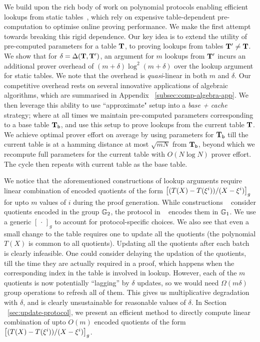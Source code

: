 \smallskip

 We build upon the rich body of work on polynomial protocols enabling efficient lookups from static tables~\cite{CCS:ZBKMNS22,EPRINT:PosKat22,EPRINT:ZGKMR22,EPRINT:EagFioGab22}, which rely on expensive table-dependent pre-computation
to optimise online proving performance. We make the first attempt towards breaking this rigid dependence.
Our key idea is to extend the utility of pre-computed
parameters for a table $\mathbf{T}$, to proving lookups from tables $\mathbf{T}'\neq \mathbf{T}$.
We show that for $\delta=\Delta(\mathbf{T}, \mathbf{T}')$,
an argument for $m$ lookups from $\mathbf{T}'$ incurs an additional prover overhead of $(m+\delta)\log^2(m+\delta)$ over the
lookup argument for static tables. We note that the overhead is {\em quasi}-linear in both $m$ and $\delta$.
Our competitive overhead rests on several innovative applications of algebraic
algorithms, which are summarised in Appendix ~\ref{subsec:comp-algebra-app}. We then leverage this ability to use ``approximate"
setup into a {\em base + cache} strategy; where at all times we maintain pre-computed parameters corresponding to
a base table $\mathbf{T}_{\mathsf{b}}$, and use this setup to prove lookups from the current table $\mathbf{T}$. We achieve optimal
prover effort on average by using parameters for $\mathbf{T}_{\mathsf{b}}$ till the current table is at a hamming distance
at most $\sqrt{mN}$ from $\mathbf{T}_{\mathsf{b}}$, beyond which we recompute full parameters for the current table with
$O(N\log N)$ prover effort. The cycle then repeats with current table as the base table.

\smallskip

 We notice that the aforementioned constructions of lookup arguments require linear combination of
encoded quotients of the form $\left[{(T(X)-T(\xi^i))/(X-\xi^i)}\right]_g$ for upto $m$ values of $i$ during the proof generation.
While constructions ~\cite{CCS:ZBKMNS22,EPRINT:PosKat22}
consider quotients encoded in the group $\mathbb{G}_2$, the protocol in ~\cite{EPRINT:EagFioGab22} encodes them in $\mathbb{G}_1$.
We use a generic $[\,\cdot\,]_g$ to
account for protocol-specific choices. We also see that even a small change to the table requires one to update all the quotients (the polynomial $T(X)$ is
common to all quotients). Updating all the quotients after each batch is clearly infeasible. One could consider delaying the updation of the quotients, till
the time they are actually required in a proof, which happens when the corresponding index in the table is involved in lookup. However, each of the $m$ quotients
is now potentially ``lagging'' by $\delta$ updates, so we would need $\Omega(m\delta)$ group operations to refresh all of them. This gives us multiplicative degradation
with $\delta$, and is clearly unsustainable for reasonable values of $\delta$. In Section ~\ref{sec:update-protocol}, we present an efficient method
to directly compute linear combination of upto $O(m)$ encoded quotients of the form $\left[{(T(X)-T(\xi^i))/(X-\xi^i)}\right]_g$.

